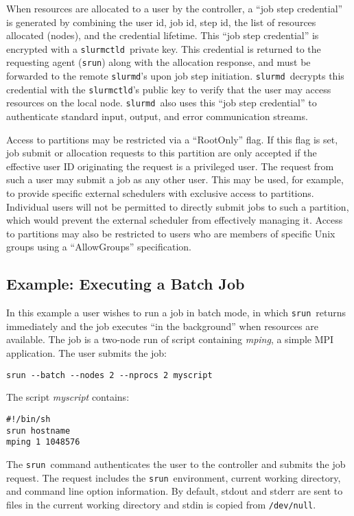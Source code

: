 \documentclass{article}
\newcommand{\srun}{{\tt srun}}
\newcommand{\slurmctld}{{\tt slurmctld}}
\newcommand{\slurmd}{{\tt slurmd}}
\begin{document}
When resources are allocated to a user by the controller, a ``job 
step credential'' is generated by combining the user id, job id, 
step id, the list of resources allocated (nodes), and the credential
lifetime. This ``job step credential'' is encrypted with 
a \slurmctld\ private key. This credential 
is returned to the requesting agent ({\tt srun}) along with the
allocation response, and must be forwarded to the remote {\tt slurmd}'s 
upon job step initiation. \slurmd\ decrypts this credential with the
\slurmctld 's public key to verify that the user may access
resources on the local node. \slurmd\ also uses this ``job step credential'' 
to authenticate standard input, output, and error communication streams. 

Access to partitions may be restricted via a ``RootOnly'' flag.  
If this flag is set, job submit or allocation requests to this 
partition are only accepted if the effective user ID originating 
the request is a privileged user. 
The request from such a user may submit a job as any other user. 
This may be used, for example, to provide specific external schedulers
with exclusive access to partitions.  Individual users will not be 
permitted to directly submit jobs to such a partition, which would 
prevent the external scheduler from effectively managing it.  
Access to partitions may also be restricted to users who are 
members of specific Unix groups using a ``AllowGroups'' specification.

\subsection{Example:  Executing a Batch Job}

In this example a user wishes to run a job in batch mode, in which \srun\ returns 
immediately and the job executes ``in the background'' when resources
are available.
The job is a two-node run of script containing {\em mping}, a simple MPI application.
The user submits the job:
\begin{verbatim}
srun --batch --nodes 2 --nprocs 2 myscript
\end{verbatim}
The script {\em myscript} contains:
\begin{verbatim}
#!/bin/sh
srun hostname
mping 1 1048576
\end{verbatim}

The \srun\ command authenticates the user to the controller and submits
the job request. 
The request includes the \srun\ environment, current working directory, 
and command line option information. By default, stdout and stderr are
sent to files in the current working directory and stdin is copied from
{\tt /dev/null}.
\end{document}
